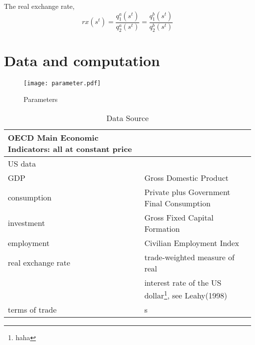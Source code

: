 \documentclass[11pt,a4paper]{article}
\begin{document}
The real exchange rate,
\begin{equation}
rx(s^t)=\frac{q_1^a(s^t)}{q_2^a(s^t)}=\frac{q_1^b(s^t)}{q_2^b(s^t)}
\end{equation}

\section{Data and computation}
\begin{figure}[H]
    \begin{center}
        \texttt{[image: parameter.pdf]}
    \end{center}
    \caption{Parameters}
    \label{parameter}
\end{figure}
\begin{table}[H]
    \caption{Data Source}
    \label{DataSource}
    \begin{center}
       \begin{tabular}{ll}
    OECD Main Economic Indicators: all at constant price &                                                \\
    \hline
    \hline
    US data               &                                                \\
    \hline
    GDP                   & Gross Domestic Product                         \\
    consumption           & Private plus Government Final Consumption      \\
    investment            & Gross Fixed Capital Formation                  \\
    employment            & Civilian Employment Index                      \\
    real exchange rate    & trade-weighted measure of real                 \\
                          & interest rate of the US dollar\footnote{haha}, see Leahy(1998) \\
    terms of trade        & s\\
    \hline
\end{tabular}
    \end{center}
\end{table}
\end{document}
